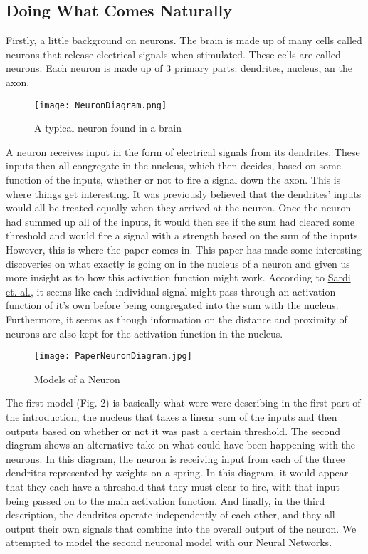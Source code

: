 \documentclass[conference]{IEEEtran}
\begin{document}
\subsection{Doing What Comes Naturally}
Firstly, a little background on neurons. The brain is made up of many cells called neurons that release electrical signals when stimulated. These cells are called neurons. Each neuron is made up of 3 primary parts: dendrites, nucleus, an the axon. 
\begin{figure}[h]
\centerline{\texttt{[image: NeuronDiagram.png]}}
\caption{A typical neuron found in a brain}
\label{fig}
\end{figure}

A neuron receives input in the form of electrical signals from its dendrites. These inputs then all congregate in the nucleus, which then decides, based on some function of the inputs, whether or not to fire a signal down the axon. This is where things get interesting. It was previously believed that the dendrites’ inputs would all be treated equally when they arrived at the neuron. Once the neuron had summed up all of the inputs, it would then see if the sum had cleared some threshold and would fire a signal with a strength based on the sum of the inputs.  However, this is where the paper comes in. This paper has made some interesting discoveries on what exactly is going on in the nucleus of a neuron and given us more insight as to how this activation function might work. According to \href{https://www.nature.com/articles/s41598-017-18363-1}{Sardi et. al.}, it seems like each individual signal might pass through an activation function of it’s own before being congregated into the sum with the nucleus. Furthermore, it seems as though information on the distance and proximity of neurons are also kept for the activation function in the nucleus.\newline

\begin{figure}[h]
\centerline{\texttt{[image: PaperNeuronDiagram.jpg]}}
\caption{Models of a Neuron}
\label{fig}
\end{figure} 

The first model (Fig. 2) is basically what were were describing in the first part of the introduction, the nucleus that takes a linear sum of the inputs and then outputs based on whether or not it was past a certain threshold. The second diagram shows an alternative take on what could have been happening with the neurons. In this diagram, the neuron is receiving input from each of the three dendrites represented by weights on a spring. In this diagram, it would appear that they each have a threshold that they must clear to fire, with that input being passed on to the main activation function. And finally, in the third description, the dendrites operate independently of each other, and they all output their own signals that combine into the overall output of the neuron. We attempted to model the second neuronal model with our Neural Networks. \newline
\end{document}
